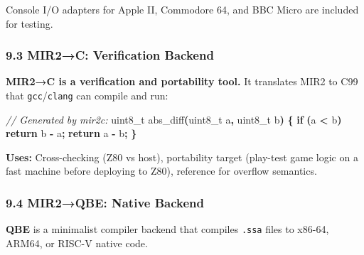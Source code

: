 \documentclass[
  11pt,
  a4paper,
]{report}
\newenvironment{Shaded}{\begin{snugshade}\small}{\end{snugshade}}
\newcommand{\CommentTok}[1]{\textcolor[rgb]{0.56,0.35,0.01}{\textit{#1}}}
\newcommand{\ControlFlowTok}[1]{\textcolor[rgb]{0.13,0.29,0.53}{\textbf{#1}}}
\newcommand{\DataTypeTok}[1]{\textcolor[rgb]{0.13,0.29,0.53}{#1}}
\newcommand{\NormalTok}[1]{#1}
\newcommand{\OperatorTok}[1]{\textcolor[rgb]{0.81,0.36,0.00}{\textbf{#1}}}
\begin{document}
Console I/O adapters for Apple II, Commodore 64, and BBC Micro are
included for testing.

\subsubsection{9.3 MIR2→C: Verification
Backend}\label{mir2c-verification-backend}

\textbf{MIR2→C is a verification and portability tool.} It translates
MIR2 to C99 that \texttt{gcc}/\texttt{clang} can compile and run:

\begin{Shaded}
\begin{Highlighting}[]
\CommentTok{// Generated by mir2c:}
\DataTypeTok{uint8\_t}\NormalTok{ abs\_diff}\OperatorTok{(}\DataTypeTok{uint8\_t}\NormalTok{ a}\OperatorTok{,} \DataTypeTok{uint8\_t}\NormalTok{ b}\OperatorTok{)} \OperatorTok{\{}
    \ControlFlowTok{if} \OperatorTok{(}\NormalTok{a }\OperatorTok{\textless{}}\NormalTok{ b}\OperatorTok{)} \ControlFlowTok{return}\NormalTok{ b }\OperatorTok{{-}}\NormalTok{ a}\OperatorTok{;}
    \ControlFlowTok{return}\NormalTok{ a }\OperatorTok{{-}}\NormalTok{ b}\OperatorTok{;}
\OperatorTok{\}}
\end{Highlighting}
\end{Shaded}

\textbf{Uses:} Cross-checking (Z80 vs host), portability target
(play-test game logic on a fast machine before deploying to Z80),
reference for overflow semantics.

\subsubsection{9.4 MIR2→QBE: Native
Backend}\label{mir2qbe-native-backend}

\textbf{QBE} is a minimalist compiler backend that compiles
\texttt{.ssa} files to x86-64, ARM64, or RISC-V native code.

\begin{Shaded}
\end{Shaded}
\end{document}
